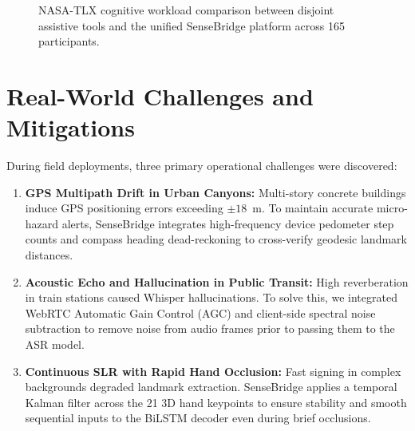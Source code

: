 \documentclass[conference]{IEEEtran}
\begin{document}
\begin{figure}[htbp]
\centering
{}
\caption{NASA-TLX cognitive workload comparison between disjoint assistive tools and the unified SenseBridge platform across 165 participants.}
\label{fig:nasa_tlx_full}
\end{figure}

\section{Real-World Challenges and Mitigations}

During field deployments, three primary operational challenges were discovered:
\begin{enumerate}
    \item \textbf{GPS Multipath Drift in Urban Canyons:} Multi-story concrete buildings induce GPS positioning errors exceeding $\pm 18$~m. To maintain accurate micro-hazard alerts, SenseBridge integrates high-frequency device pedometer step counts and compass heading dead-reckoning to cross-verify geodesic landmark distances.
    \item \textbf{Acoustic Echo and Hallucination in Public Transit:} High reverberation in train stations caused Whisper hallucinations. To solve this, we integrated WebRTC Automatic Gain Control (AGC) and client-side spectral noise subtraction to remove noise from audio frames prior to passing them to the ASR model.
    \item \textbf{Continuous SLR with Rapid Hand Occlusion:} Fast signing in complex backgrounds degraded landmark extraction. SenseBridge applies a temporal Kalman filter across the 21 3D hand keypoints to ensure stability and smooth sequential inputs to the BiLSTM decoder even during brief occlusions.
\end{enumerate}
\end{document}

